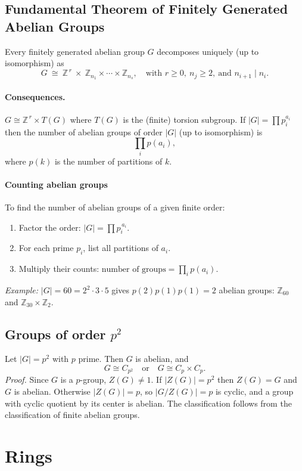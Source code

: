 \documentclass[12pt]{article}
\begin{document}
\subsection{Fundamental Theorem of Finitely Generated Abelian Groups}
Every finitely generated abelian group $G$ decomposes uniquely (up to isomorphism) as
\[
G \ \cong\ \mathbb{Z}^{\,r}\ \times\ \mathbb{Z}_{n_1}\times\cdots\times \mathbb{Z}_{n_s},
\quad\text{with } r\ge 0,\ n_j\ge 2,\ \text{and } n_{i+1}\mid n_i.
\]

\paragraph{Consequences.}
$G \cong \mathbb{Z}^{\,r}\times T(G)$ where $T(G)$ is the (finite) torsion subgroup.  
If $|G|= \prod p_i^{a_i}$ then the number of abelian groups of order $|G|$ (up to isomorphism) is
\[
\prod_i p(a_i),
\]
where $p(k)$ is the number of partitions of $k$.

\paragraph{Counting abelian groups}
To find the number of abelian groups of a given finite order:
\begin{enumerate}[leftmargin=1.5em]
  \item Factor the order: $|G|=\prod p_i^{\,a_i}$.
  \item For each prime $p_i$, list all partitions of $a_i$.
  \item Multiply their counts: $\text{number of groups}=\prod_i p(a_i)$.
\end{enumerate}
\emph{Example:} $|G|=60=2^2\cdot3\cdot5$ gives $p(2)p(1)p(1)=2$ abelian groups:
$\mathbb Z_{60}$ and $\mathbb Z_{30}\times\mathbb Z_2$.

\subsection{Groups of order $p^2$}
Let $|G|=p^2$ with $p$ prime. Then $G$ is abelian, and
\[
G \cong C_{p^2}\quad \text{or}\quad G \cong C_p\times C_p .
\]
\emph{Proof.} Since $G$ is a $p$-group, $Z(G)\neq 1$. If $|Z(G)|=p^2$ then $Z(G)=G$ and $G$ is abelian. 
Otherwise $|Z(G)|=p$, so $|G/Z(G)|=p$ is cyclic, and a group with cyclic quotient by its center is abelian. 
The classification follows from the classification of finite abelian groups.


\section{Rings}
\end{document}
